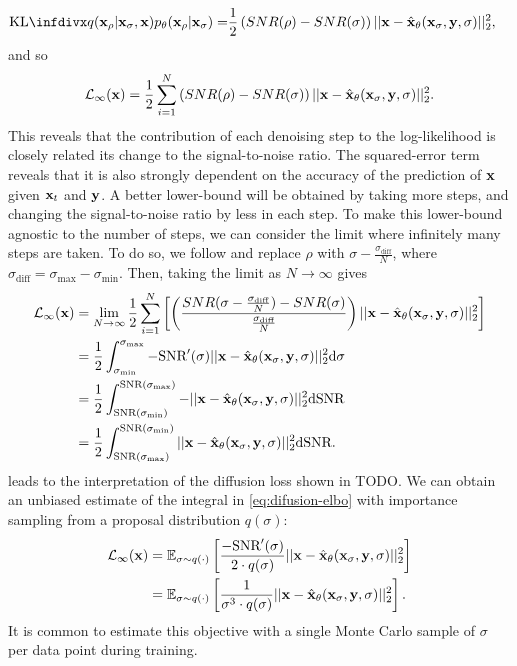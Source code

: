 \begin{align}
\kl{q(\rvx_{\rho} | \rvx_{\sigma}, \rvx)}{p_\theta(\rvx_{\rho} | \rvx_{\sigma})} = &\frac{1}{2} \left( SNR(\rho) - SNR(\sigma) \right) || \rvx - \hat{\rvx}_\theta(\rvx_\sigma, \rvy, \sigma) ||_2^2,
\end{align}
and so
\begin{align}
    \mathcal{L}_\infty({\mathbf{x}}) = \frac{1}{2} \sum_{i=1}^N \left( SNR(\rho) - SNR(\sigma) \right) || {\mathbf{x}} - \hat{{\mathbf{x}}}_\theta({\mathbf{x}}_\sigma, {\mathbf{y}}, \sigma) ||_2^2.
\end{align}
This reveals that the contribution of each denoising step to the log-likelihood is closely related its change to the signal-to-noise ratio. The squared-error term reveals that it is also strongly dependent on the accuracy of the prediction of ${\mathbf{x}}$ given ${\mathbf{x}}_t$ and ${\mathbf{y}}$. A better lower-bound will be obtained by taking more steps, and changing the signal-to-noise ratio by less in each step. To make this lower-bound agnostic to the number of steps, we can consider the limit where infinitely many steps are taken. To do so, we  follow \citet{kingma2021variational} and replace $\rho$ with $\sigma-\frac{\sigma_\text{diff}}{N}$, where $\sigma_\text{diff} = \sigma_\text{max}-\sigma_\text{min}$. Then, taking the limit as $N \rightarrow \infty$ gives 
\begin{align}
    \mathcal{L}_\infty({\mathbf{x}}) &= \lim_{N\rightarrow\infty} \frac{1}{2} \sum_{i=1}^N \left[ \left( \frac{SNR(\sigma-\frac{\sigma_\text{diff}}{N}) - SNR(\sigma)}{\frac{\sigma_\text{diff}}{N}} \right) || {\mathbf{x}} - \hat{{\mathbf{x}}}_\theta({\mathbf{x}}_\sigma, {\mathbf{y}}, \sigma) ||_2^2 \right] \\
    &= \frac{1}{2} \int_{\sigma_\text{min}}^{\sigma_\text{max}} -\text{SNR}'(\sigma) || {\mathbf{x}} - \hat{{\mathbf{x}}}_\theta({\mathbf{x}}_\sigma, {\mathbf{y}}, \sigma) ||_2^2 \mathrm{d}\sigma \label{eq:difusion-elbo} \\
    &= \frac{1}{2} \int_{\text{SNR}(\sigma_\text{min})}^{\text{SNR}(\sigma_\text{max})} - || {\mathbf{x}} - \hat{{\mathbf{x}}}_\theta({\mathbf{x}}_\sigma, {\mathbf{y}}, \sigma) ||_2^2 \mathrm{d}\text{SNR} \\
    &= \frac{1}{2} \int_{\text{SNR}(\sigma_\text{max})}^{\text{SNR}(\sigma_\text{min})} || {\mathbf{x}} - \hat{{\mathbf{x}}}_\theta({\mathbf{x}}_\sigma, {\mathbf{y}}, \sigma) ||_2^2 \mathrm{d}\text{SNR}. \label{eq:diffusion-integral-dsnr}
\end{align}
 leads to the interpretation of the diffusion loss shown in TODO. We can obtain an unbiased estimate of the integral in \cref{eq:difusion-elbo} with importance sampling from a proposal distribution $q(\sigma)$: 
\begin{align}
    \mathcal{L}_\infty({\mathbf{x}}) &= \mathbb{E}_{\sigma \sim q(\cdot)} \left[ \frac{-\text{SNR}'(\sigma)}{2 \cdot q(\sigma)} || {\mathbf{x}} - \hat{{\mathbf{x}}}_\theta({\mathbf{x}}_\sigma, {\mathbf{y}}, \sigma) ||_2^2 \right]  \\
    &= \mathbb{E}_{\sigma \sim q(\cdot)} \left[ \frac{1}{\sigma^3 \cdot q(\sigma)} || {\mathbf{x}} - \hat{{\mathbf{x}}}_\theta({\mathbf{x}}_\sigma, {\mathbf{y}}, \sigma) ||_2^2 \right]. \label{eq:diffusion-loss}
\end{align}
It is common to estimate this objective with a single Monte Carlo sample of $\sigma$ per data point during training.


